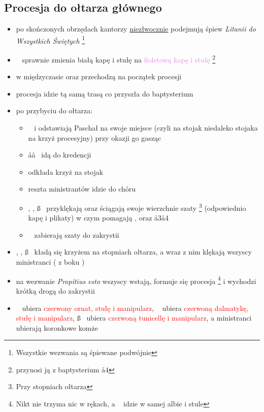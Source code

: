 \subsection{Procesja do ołtarza głównego}
\begin{itemize}
	\item po skończonych obrzędach kantorzy \underline{niezłwocznie} podejmują
	      śpiew \textit{Litanii do Wszystkich Świętych} \footnote{Wszystkie
		      wezwania są śpiewane podwójnie}
	\item \ii~ sprawnie zmienia \textcolor{black!50}{białą kapę i stułę} na
	      \textcolor{violet}{fioletową kapę i stułę} \footnote{przynosi ją z
		      baptysterium \aa4}
	\item w międzyczasie \paschal oraz  przechodzą na początek procesji
	\item procesja idzie tą samą trasą co przyszła do baptysterium
	\item po przybyciu do ołtarza:
	      \begin{itemize}
		      \item \paschal~ i  odstawiają Paschał na swoje miejsce (czyli
		            na stojak niedaleko stojaka na krzyż procesyjny) przy okazji
		            go gasząc
		      \item \aa\aa~ idą do kredencji
		      \item {} odkłada krzyż na stojak
		      \item reszta ministrantów idzie do chóru
		      \item \ii, \dd, \ss~ przyklękają oraz ściągają swoje wierzchnie
		            szaty \footnote{Przy stopniach ołtarza} (odpowiednio kapę i
		            plikaty) w czym pomagają ,  oraz \aa3\aa4
		      \item \zz\zz~ zabierają szaty do zakrystii
	      \end{itemize}
	\item \ii, \dd, \ss~ kładą się krzyżem na stopniach ołtarza, a wraz z nim
	      klękają wszyscy ministranci ( z boku \dd)
	\item na wezwanie \textit{Propitius esto} wszyscy wstają, formuje się
	      procesja \footnote{Nikt nie trzyma nic w rękach, a \ii~ idzie w samej
	      albie i stule} i wychodzi krótką drogą do zakrystii
	\item \ii~ ubiera \textcolor{red}{czerwony ornat, stułę i manipularz}, \dd~
	      ubiera \textcolor{red}{czerwoną dalmatykę, stułę i manipularz},
	      \ss~ ubiera \textcolor{red}{czerwoną tunicellę i manipularz}, a
	      ministranci ubierają koronkowe komże
\end{itemize}
